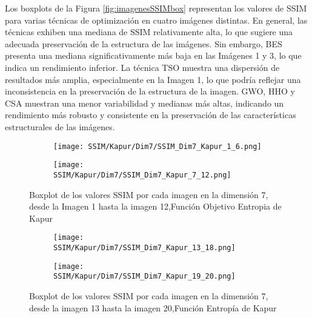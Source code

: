 \documentclass[conference]{IEEEtran}
\begin{document}
\noindent Los boxplots de la Figura \ref{fig:imagenesSSIMbox} representan los valores de SSIM para varias técnicas de optimización en cuatro imágenes distintas. En general, las técnicas exhiben una mediana de SSIM relativamente alta, lo que sugiere una adecuada preservación de la estructura de las imágenes. Sin embargo, BES presenta una mediana significativamente más baja en las Imágenes 1 y 3, lo que indica un rendimiento inferior. La técnica TSO muestra una dispersión de resultados más amplia, especialmente en la Imagen 1, lo que podría reflejar una inconsistencia en la preservación de la estructura de la imagen. GWO, HHO y CSA muestran una menor variabilidad y medianas más altas, indicando un rendimiento más robusto y consistente en la preservación de las características estructurales de las imágenes.

\begin{figure}
	\centering
	
	\begin{subfigure}{0.5\textwidth}
		\texttt{[image: SSIM/Kapur/Dim7/SSIM\_Dim7\_Kapur\_1\_6.png]}
	\end{subfigure}
	
	\begin{subfigure}{0.5\textwidth}
		\texttt{[image: SSIM/Kapur/Dim7/SSIM\_Dim7\_Kapur\_7\_12.png]}
	\end{subfigure}
	\caption{Boxplot de los valores SSIM por cada imagen en la dimensión 7, desde la Imagen 1 hasta la imagen 12,Función Objetivo Entropia de Kapur}
	\label{fig:imagenes}    
\end{figure}

\begin{figure}
	\centering
	\begin{subfigure}{0.5\textwidth}
		\texttt{[image: SSIM/Kapur/Dim7/SSIM\_Dim7\_Kapur\_13\_18.png]}
	\end{subfigure}   
	\begin{subfigure}{0.5\textwidth}
		\texttt{[image: SSIM/Kapur/Dim7/SSIM\_Dim7\_Kapur\_19\_20.png]}
		\vspace{-150pt} %
	\end{subfigure}
	\caption{Boxplot de los valores SSIM por cada imagen en la dimensión 7, desde la imagen 13 hasta la imagen 20,Función Entropía de Kapur}
	\label{fig:imagenes}    
\end{figure}
\end{document}
